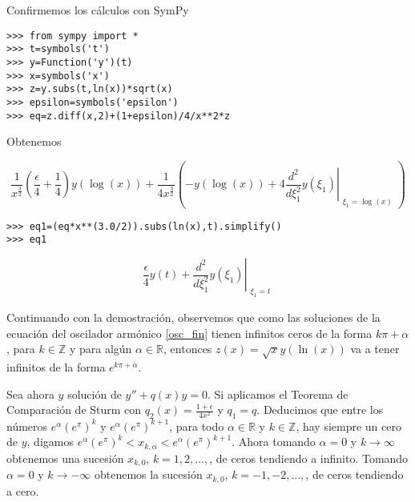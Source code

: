 \begin{demo}
Confirmemos los cálculos con SymPy
\begin{lstlisting}
>>> from sympy import *
>>> t=symbols('t') 
>>> y=Function('y')(t)
>>> x=symbols('x') 
>>> z=y.subs(t,ln(x))*sqrt(x)
>>> epsilon=symbols('epsilon')
>>> eq=z.diff(x,2)+(1+epsilon)/4/x**2*z
\end{lstlisting}

Obtenemos

\[
\frac{1}{x^{\frac{3}{2}}} \left(\frac{\epsilon}{4} + \frac{1}{4}\right) y{\left (\log{\left (x \right )} \right )} + \frac{1}{4 x^{\frac{3}{2}}} \left(- y{\left (\log{\left (x \right )} \right )} + 4 \left. \frac{d^{2}}{d \xi_{1}^{2}}  y{\left (\xi_{1} \right )} \right|_{\substack{ \xi_{1}=\log{\left (x \right )} }}\right)
\]

\begin{lstlisting}
>>> eq1=(eq*x**(3.0/2)).subs(ln(x),t).simplify() 
>>> eq1
\end{lstlisting}

\[\frac{\epsilon}{4} y{\left (t \right )} + \left. \frac{d^{2}}{d \xi_{1}^{2}}  y{\left (
\xi_{1} \right )} \right|_{\substack{ \xi_{1}=t }}\]

Continuando con la demostración, observemos que como las soluciones de la ecuación del oscilador armónico \eqref{osc_fin} tienen infinitos ceros de la forma $k\pi+\alpha$, para $k\in\mathbb{Z}$ y para algún $\alpha\in\mathbb{R}$, entonces $z(x)=\sqrt{x}y(\ln(x))$ va a tener infinitos
de la forma $e^{k\pi+\alpha}$. 

Sea ahora $y$ solución de $y''+q(x)y=0$. Si aplicamos el Teorema de Comparación de Sturm con $q_2(x)=\frac{1+\epsilon}{4x^2}$ y $q_1=q$. Deducimos que entre los números  $e^{\alpha}(e^{\pi})^k$ y $e^{\alpha}(e^{\pi})^{k+1}$, para todo $\alpha\in\mathbb{R}$ y $k\in\mathbb{Z}$, hay siempre un cero de $y$, digamos  $e^{\alpha}(e^{\pi})^k<x_{k,\alpha}<e^{\alpha}(e^{\pi})^{k+1}$. Ahora tomando $\alpha=0$ y $k\to\infty$ obtenemos una sucesión $x_{k,0}$, $k=1,2,\ldots,$, de ceros tendiendo a infinito. Tomando $\alpha=0$ y   $k\to-\infty$ obtenemos la sucesión $x_{k,0}$, $k=-1,-2,\ldots,$, de ceros tendiendo a cero.
\end{demo}

